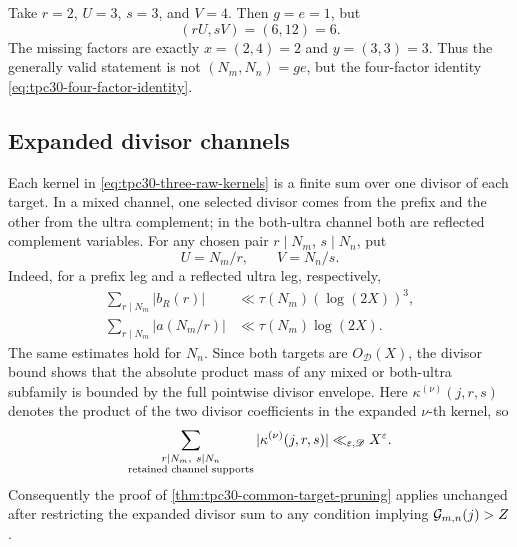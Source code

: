 \begin{remark}
\label{rem:tpc30-cross-terms-needed}
Take $r=2$, $U=3$, $s=3$, and $V=4$.  Then $g=e=1$, but
\[
 (rU,sV)=(6,12)=6.
\]
The missing factors are exactly
$x=(2,4)=2$ and $y=(3,3)=3$.  Thus the generally valid statement is
not $(N_m,N_n)=ge$, but the four-factor identity
\eqref{eq:tpc30-four-factor-identity}.
\end{remark}

\subsection{Expanded divisor channels}

Each kernel in \eqref{eq:tpc30-three-raw-kernels} is a finite sum over
one divisor of each target.  In a mixed channel, one selected divisor
comes from the prefix and the other from the ultra complement; in the
both-ultra channel both are reflected complement variables.  For any
chosen pair $r\mid N_m$, $s\mid N_n$, put
\begin{equation}
 U=N_m/r,\qquad V=N_n/s.
 \label{eq:tpc30-co-divisors}
\end{equation}
Indeed, for a prefix leg and a reflected ultra leg, respectively,
\begin{align}
 \sum_{r\mid N_m}|b_R(r)|
 &\ll \tau(N_m)(\log(2X))^3,
 \label{eq:tpc30-prefix-absolute-mass}\\
 \sum_{r\mid N_m}|a(N_m/r)|
 &\ll \tau(N_m)\log(2X).
 \label{eq:tpc30-ultra-absolute-mass}
\end{align}
The same estimates hold for $N_n$.  Since both targets are
$O_{\mathscr D}(X)$, the divisor bound shows that the absolute product
mass of any mixed or both-ultra subfamily is bounded by the full
pointwise divisor envelope.  Here $\kappa^{(\nu)}(j,r,s)$ denotes the
product of the two divisor coefficients in the expanded $\nu$-th
kernel, so
\begin{equation}
 \sum_{\substack{r\mid N_m,\ s\mid N_n\\
                  \textup{retained channel supports}}}
 |\kappa^{(\nu)}(j,r,s)|
 \ll_{\eps,\mathscr D}X^\eps.
 \label{eq:tpc30-expanded-envelope}
\end{equation}
Consequently the proof of
\cref{thm:tpc30-common-target-pruning} applies unchanged after
restricting the expanded divisor sum to any condition implying
$\mathcal G_{m,n}(j)>Z$.

